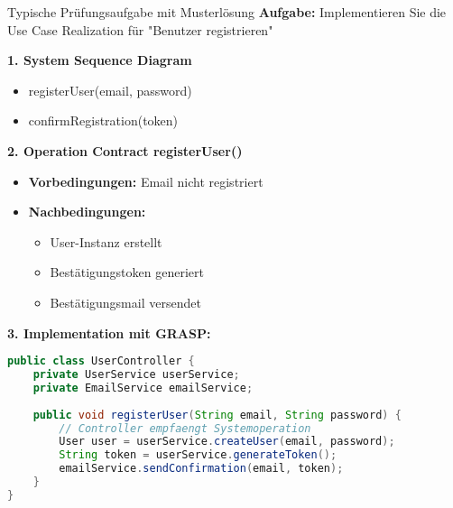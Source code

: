 \begin{example2}{Typische Prüfungsaufgabe mit Musterlösung}
\textbf{Aufgabe:} Implementieren Sie die Use Case Realization für "Benutzer registrieren"

\textbf{1. System Sequence Diagram}
\begin{itemize}
    \item registerUser(email, password)
    \item confirmRegistration(token)
\end{itemize}

\textbf{2. Operation Contract registerUser()}
\begin{itemize}
    \item \textbf{Vorbedingungen:} Email nicht registriert
    \item \textbf{Nachbedingungen:}
    \begin{itemize}
        \item User-Instanz erstellt
        \item Bestätigungstoken generiert
        \item Bestätigungsmail versendet
    \end{itemize}
\end{itemize}

\textbf{3. Implementation mit GRASP:}
\begin{lstlisting}[language=Java, style=basesmol]
public class UserController {
    private UserService userService;
    private EmailService emailService;
    
    public void registerUser(String email, String password) {
        // Controller empfaengt Systemoperation
        User user = userService.createUser(email, password);
        String token = userService.generateToken();
        emailService.sendConfirmation(email, token);
    }
}
\end{lstlisting}
\end{example2}

